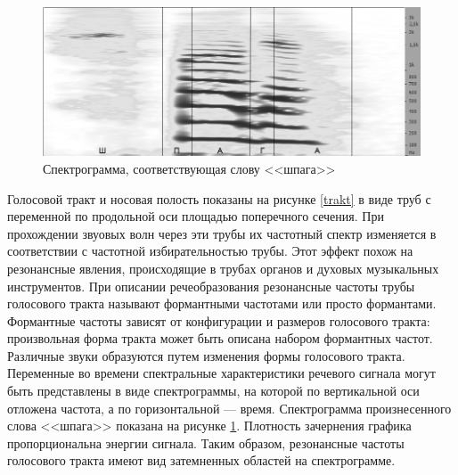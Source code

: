 \documentclass[a4paper,14pt,russian,utf8,nocolumnsxix,nocolumnxxxi,nocolumnxxxii]{eskdtext}
\begin{document}
\begin{figure}[H]	
	\centering
	\includegraphics[width=120mm]{shpaga_spect.png}			
	\caption{Спектрограмма, соответствующая слову <<шпага>>}
	\label{shpaga_spect}
\end{figure}
Голосовой тракт и носовая полость показаны на рисунке \ref{trakt} в виде труб с переменной по продольной оси площадью поперечного сечения. При прохождении звуовых волн через эти трубы их частотный спектр изменяется в соответствии с частотной избирательностью трубы. Этот эффект похож на резонансные явления, происходящие в трубах органов и духовых музыкальных инструментов. При описании речеобразования резонансные частоты трубы голосового тракта называют формантными частотами или просто формантами. Формантные частоты зависят от конфигурации и размеров голосового тракта: произвольная форма тракта может быть описана набором формантных частот. Различные звуки образуются путем изменения формы голосового тракта. Переменные во времени спектральные характеристики речевого сигнала могут быть представлены в виде спектрограммы, на которой по вертикальной оси отложена частота, а по горизонтальной --- время. Спектрограмма произнесенного слова <<шпага>> показана на рисунке \ref{shpaga_spect}. Плотность зачернения графика пропорциональна энергии сигнала. Таким образом, резонансные частоты голосового тракта имеют вид затемненных областей на спектрограмме. 
\end{document}
